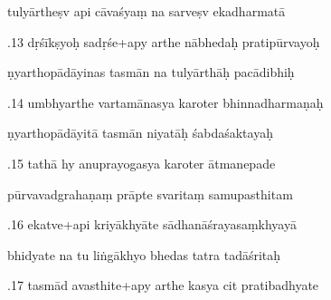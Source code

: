 \documentclass[article,12pt,a4paper]{memoir}%
\newcounter{parCount}
\begin{document}
	  
	  \pstart \leavevmode%
	tulyārtheṣv api cāvaśyaṃ na sarveṣv ekadharmatā 
	{}
	\pend%
      

	  
	  \pstart {}.13 dṛśīkṣyoḥ sadṛśe+apy arthe nābhedaḥ pratipūrvayoḥ 
	{}
	\pend%
      

	  
	  \pstart \leavevmode%
	ṇyarthopādāyinas tasmān na tulyārthāḥ pacādibhiḥ 
	{}
	\pend%
      

	  
	  \pstart {}.14 umbhyarthe vartamānasya karoter bhinnadharmaṇaḥ 
	{}
	\pend%
      

	  
	  \pstart \leavevmode%
	ṇyarthopādāyitā tasmān niyatāḥ śabdaśaktayaḥ 
	{}
	\pend%
      

	  
	  \pstart {}.15 tathā hy anuprayogasya karoter ātmanepade 
	{}
	\pend%
      

	  
	  \pstart \leavevmode%
	pūrvavadgrahaṇaṃ prāpte svaritaṃ samupasthitam 
	{}
	\pend%
      

	  
	  \pstart {}.16 ekatve+api kriyākhyāte   sādhanāśrayasaṃkhyayā 
	{}
	\pend%
      

	  
	  \pstart \leavevmode%
	bhidyate na tu liṅgākhyo bhedas tatra tadāśritaḥ 
	{}
	\pend%
      

	  
	  \pstart {}.17 tasmād avasthite+apy arthe kasya cit pratibadhyate 
	{}
	\pend%
      
\end{document}

